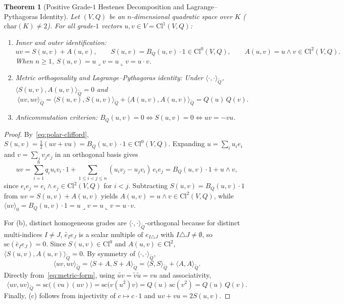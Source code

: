 \documentclass[11pt]{article}
\theoremstyle{plain}
\newtheorem{theorem}{Theorem}[section]
\theoremstyle{definition}
\theoremstyle{remark}
\newcommand{\Cl}{\mathrm{Cl}}
\newcommand{\grade}[2]{\langle #1 \rangle_{#2}}
\newcommand{\lcontract}{\mathbin{\lrcorner}}
\newcommand{\rcontract}{\mathbin{\llcorner}}
\begin{document}
\begin{theorem}[Positive Grade-$1$ Hestenes Decomposition and Lagrange--Pythagoras Identity]\label{thm:grade1}
Let $(V, Q)$ be an $n$-dimensional quadratic space over $K$ ($\mathrm{char}(K) \neq 2$). For all grade-$1$ vectors $u, v \in V = \Cl^1(V, Q)$:
\begin{enumerate}
  \item[(a)] \emph{Inner and outer identification:}
  \[
    u v = S(u, v) + A(u, v), \qquad
    S(u, v) = B_Q(u, v)\cdot 1 \in \Cl^0(V, Q), \qquad
    A(u, v) = u \wedge v \in \Cl^2(V, Q).
  \]
  When $n \ge 1$, $S(u, v) = u \lcontract v = u \rcontract v = u \cdot v$.
  \item[(b)] \emph{Metric orthogonality and Lagrange--Pythagoras identity:} Under $\langle \cdot, \cdot \rangle_{\widetilde{Q}}$, $\langle S(u, v), A(u, v) \rangle_{\widetilde{Q}} = 0$ and
  \[
    \langle u v, u v \rangle_{\widetilde{Q}} = \bigl\langle S(u, v), S(u, v) \bigr\rangle_{\widetilde{Q}} + \bigl\langle A(u, v), A(u, v) \bigr\rangle_{\widetilde{Q}} = Q(u)\,Q(v).
  \]
  \item[(c)] \emph{Anticommutation criterion:} $B_Q(u, v) = 0 \iff S(u, v) = 0 \iff u v = - v u$.
\end{enumerate}
\end{theorem}
\begin{proof}
By~\eqref{eq:polar-clifford}, $S(u, v) = \frac{1}{2}(u v + v u) = B_Q(u, v)\cdot 1 \in \Cl^0(V, Q)$. Expanding $u = \sum_i u_i e_i$ and $v = \sum_j v_j e_j$ in an orthogonal basis gives
\[
  u v = \sum_{i=1}^n q_i u_i v_i \cdot 1 + \sum_{1 \le i < j \le n} (u_i v_j - u_j v_i)\,e_i e_j = B_Q(u, v)\cdot 1 + u \wedge v,
\]
since $e_i e_j = e_i \wedge e_j \in \Cl^2(V, Q)$ for $i < j$. Subtracting $S(u, v) = B_Q(u, v)\cdot 1$ from $u v = S(u, v) + A(u, v)$ yields $A(u, v) = u \wedge v \in \Cl^2(V, Q)$, while $\grade{u v}{0} = B_Q(u, v)\cdot 1 = u \lcontract v = u \rcontract v = u \cdot v$.

For (b), distinct homogeneous grades are $\langle \cdot, \cdot \rangle_{\widetilde{Q}}$-orthogonal because for distinct multi-indices $I \neq J$, $\widetilde{e_I} e_J$ is a scalar multiple of $e_{I \triangle J}$ with $I \triangle J \neq \emptyset$, so $\mathrm{sc}(\widetilde{e_I} e_J) = 0$. Since $S(u, v) \in \Cl^0$ and $A(u, v) \in \Cl^2$, $\langle S(u, v), A(u, v) \rangle_{\widetilde{Q}} = 0$. By symmetry of $\langle \cdot, \cdot \rangle_{\widetilde{Q}}$,
\[
  \langle u v, u v \rangle_{\widetilde{Q}} = \langle S + A, S + A \rangle_{\widetilde{Q}} = \langle S, S \rangle_{\widetilde{Q}} + \langle A, A \rangle_{\widetilde{Q}}.
\]
Directly from~\eqref{eq:metric-form}, using $\widetilde{u v} = \widetilde{v}\widetilde{u} = v u$ and associativity,
\[
  \langle u v, u v \rangle_{\widetilde{Q}} = \mathrm{sc}\bigl((v u)(u v)\bigr) = \mathrm{sc}\bigl(v (u^2) v\bigr) = Q(u)\,\mathrm{sc}(v^2) = Q(u)\,Q(v).
\]
Finally, (c) follows from injectivity of $c \mapsto c\cdot 1$ and $u v + v u = 2 S(u, v)$.
\end{proof}
\end{document}
